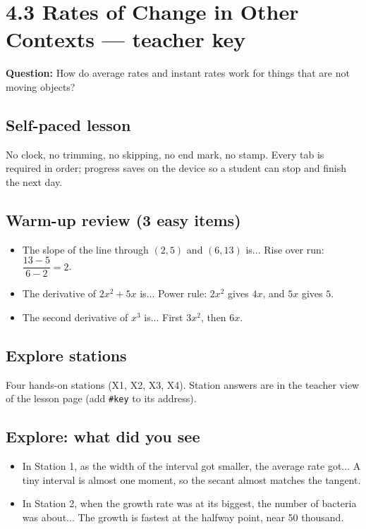\documentclass[11pt]{article}
\begin{document}
\section*{4.3 Rates of Change in Other Contexts --- teacher key}
\textbf{Question:} How do average rates and instant rates work for things that are not moving objects?\par
\subsection*{Self-paced lesson}No clock, no trimming, no skipping, no end mark, no stamp. Every tab is required in order; progress saves on the device so a student can stop and finish the next day.\par
\subsection*{Warm-up review (3 easy items)}\begin{itemize}
\item The slope of the line through $(2,5)$ and $(6,13)$ is...  Rise over run: $\dfrac{13-5}{6-2}=2$.
\item The derivative of $2x^2+5x$ is...  Power rule: $2x^2$ gives $4x$, and $5x$ gives $5$.
\item The second derivative of $x^3$ is...  First $3x^2$, then $6x$.
\end{itemize}
\subsection*{Explore stations}Four hands-on stations (X1, X2, X3, X4). Station answers are in the teacher view of the lesson page (add \texttt{\#key} to its address).\par
\subsection*{Explore: what did you see}\begin{itemize}
\item In Station 1, as the width of the interval got smaller, the average rate got...  A tiny interval is almost one moment, so the secant almost matches the tangent.
\item In Station 2, when the growth rate was at its biggest, the number of bacteria was about...  The growth is fastest at the halfway point, near 50 thousand.
\end{itemize}
\end{document}

